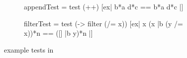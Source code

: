 \begin{figure}
    \begin{subfigure}[t]{1\linewidth}
        \begin{smallhskcode}
appendTest = test (++) [ex| { b*{a} } { d*{c} } == { b*{a} d*{c} } |]
        \end{smallhskcode}
        \caption{}
        \label{fig:list-append-ex}
    \end{subfigure}

\begin{subfigure}[t]{1\linewidth}
        \begin{smallhskcode}
filterTest = test (\x -> filter (/= x))
                    [ex| x { (x |{b} (y /= x))*{n} } == { ([] |{b} y)*{n} } |]
        \end{smallhskcode}
        \caption{}
        \label{fig:list-filter-ex}
    \end{subfigure}
    \caption{ example tests in \ourDSL}
    \label{fig:list-ex}
\end{figure}